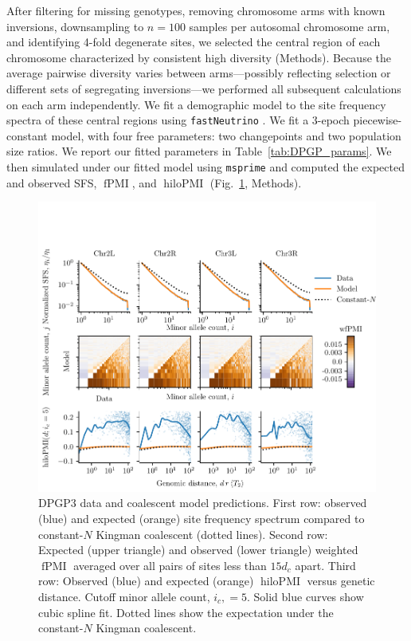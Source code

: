 \documentclass[11pt, letterpaper]{article}   	%
\newcommand{\fig}[1]{Fig.~\ref{#1}}
\DeclareMathOperator{\fpmi}{fPMI}
\DeclareMathOperator{\hilopmi}{hiloPMI}
\begin{document}
After filtering for missing genotypes, removing chromosome arms with known inversions, downsampling to $n=100$ samples per autosomal chromosome arm, and identifying 4-fold degenerate sites, we selected the central region of each chromosome characterized by consistent high diversity (Methods).
Because the average pairwise diversity varies between arms---possibly reflecting selection or different sets of segregating inversions---we performed all subsequent calculations on each arm independently.
We fit a demographic model to the site frequency spectra of these central regions using \texttt{fastNeutrino} \autocite{BhaskarEtAl2015}.
We fit a 3-epoch piecewise-constant model, with four free parameters: two changepoints and two population size ratios.
We report our fitted parameters in Table~\ref{tab:DPGP_params}.
We then simulated under our fitted model using \texttt{msprime} and computed the expected and observed SFS, $\fpmi$, and $\hilopmi$ (\fig{fig:dpgp3}, Methods).

\begin{figure}
\centering
\includegraphics[scale=1]{figures/dpgp3_analysis.pdf}
\caption{DPGP3 data and coalescent model predictions. First row: observed (blue) and expected (orange) site frequency spectrum compared to constant-$N$ Kingman coalescent (dotted lines). Second row: Expected (upper triangle) and observed (lower triangle) weighted $\fpmi$ averaged over all pairs of sites less than $15 d_c$ apart. Third row: Observed (blue) and expected (orange) $\hilopmi$ versus genetic distance. Cutoff minor allele count, $i_c, = 5$. Solid blue curves show cubic spline fit. Dotted lines show the expectation under the constant-$N$ Kingman coalescent. \label{fig:dpgp3}}
\end{figure}
\end{document}
